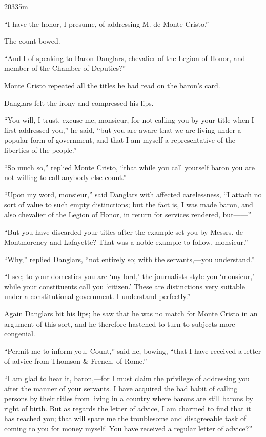 20335m



“I have the honor, I presume, of addressing M. de Monte Cristo.”

The count bowed.

“And I of speaking to Baron Danglars, chevalier of the Legion of Honor,
and member of the Chamber of Deputies?”

Monte Cristo repeated all the titles he had read on the baron’s card.

Danglars felt the irony and compressed his lips.

“You will, I trust, excuse me, monsieur, for not calling you by your
title when I first addressed you,” he said, “but you are aware that we
are living under a popular form of government, and that I am myself a
representative of the liberties of the people.”

“So much so,” replied Monte Cristo, “that while you call yourself baron
you are not willing to call anybody else count.”

“Upon my word, monsieur,” said Danglars with affected carelessness, “I
attach no sort of value to such empty distinctions; but the fact is, I
was made baron, and also chevalier of the Legion of Honor, in return
for services rendered, but——”

“But you have discarded your titles after the example set you by
Messrs. de Montmorency and Lafayette? That was a noble example to
follow, monsieur.”

“Why,” replied Danglars, “not entirely so; with the servants,—you
understand.”

“I see; to your domestics you are ‘my lord,’ the journalists style you
‘monsieur,’ while your constituents call you ‘citizen.’ These are
distinctions very suitable under a constitutional government. I
understand perfectly.”

Again Danglars bit his lips; he saw that he was no match for Monte
Cristo in an argument of this sort, and he therefore hastened to turn
to subjects more congenial.

“Permit me to inform you, Count,” said he, bowing, “that I have
received a letter of advice from Thomson \& French, of Rome.”

“I am glad to hear it, baron,—for I must claim the privilege of
addressing you after the manner of your servants. I have acquired the
bad habit of calling persons by their titles from living in a country
where barons are still barons by right of birth. But as regards the
letter of advice, I am charmed to find that it has reached you; that
will spare me the troublesome and disagreeable task of coming to you
for money myself. You have received a regular letter of advice?”

